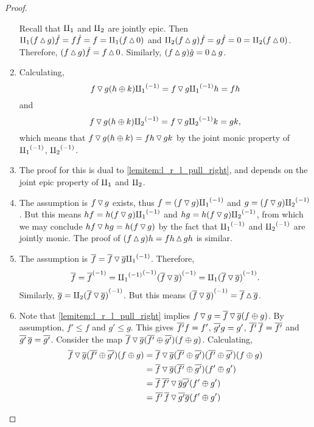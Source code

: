 \begin{proof}
\begin{enumerate}[{(}i{)}]
      Recall that $\amalg_{1}$ and $\amalg_{2}$ are jointly epic. Then
      $\amalg_{1}(f \operatorname{\vartriangle} g)\hat{f} = f\hat{f} = f = \amalg_{1}(f\operatorname{\vartriangle} 0) $ and
      $\amalg_{2}(f \operatorname{\vartriangle} g)\hat{f} = g\hat{f} = 0= \amalg_{2}(f\operatorname{\vartriangle} 0)$.
      Therefore, $(f \operatorname{\vartriangle} g)\hat{f} = f \operatorname{\vartriangle} 0$. Similarly,
      $(f \operatorname{\vartriangle} g) \hat{g} = 0 \operatorname{\vartriangle} g$.
    \item Calculating,
      \[
        f \operatorname{\triangledown} g (h \oplus k) {\amalg_{1}}^{(-1)} = f\operatorname{\triangledown} g {\amalg_{1}}^{(-1)} h = f h
      \]
      and
      \[
        f \operatorname{\triangledown} g (h \oplus k) {\amalg_{2}}^{(-1)} = f\operatorname{\triangledown} g {\amalg_{2}}^{(-1)} k = g k,
      \]
      which means that
      $f \operatorname{\triangledown} g (h \oplus k) = f h \operatorname{\triangledown} g k$ by the joint monic property of ${\amalg_{1}}^{(-1)}$, ${\amalg_{2}}^{(-1)}$.
    \item The proof for this is dual to \ref{lemitem:l_r_l_pull_right}, and depends on the joint
      epic property of $\amalg_{1}$ and $\amalg_{2}$.
    \item The assumption is $f\operatorname{\triangledown} g$ exists, thus $f = (f\operatorname{\triangledown} g){\amalg_{1}}^{(-1)}$ and
      $g = (f\operatorname{\triangledown} g){\amalg_{2}}^{(-1)}$. But this means $hf = h(f\operatorname{\triangledown} g){\amalg_{1}}^{(-1)}$ and
      $h g = h(f\operatorname{\triangledown} g){\amalg_{2}}^{(-1)}$, from which we may conclude $hf \operatorname{\triangledown} h g = h(f\operatorname{\triangledown} g)$ by
      the fact that ${\amalg_{1}}^{(-1)}$ and ${\amalg_{2}}^{(-1)}$ are jointly monic. The proof of
      $(f\operatorname{\vartriangle} g)h = f h \operatorname{\vartriangle} g h$ is similar.
    \item The assumption is $\overline{f} = \overline{f}\operatorname{\triangledown}\overline{g} {\amalg_{1}}^{(-1)}$. Therefore,
      \[
        \overline{f} = {\overline{f}}^{(-1)} = {{\amalg_{1}}^{(-1)}}^{(-1)}{(\overline{f}\operatorname{\triangledown}\overline{g})}^{(-1)}
          = \amalg_{1} {(\overline{f}\operatorname{\triangledown}\overline{g})}^{(-1)}.
      \]
      Similarly, $\overline{g} = \amalg_{2} {(\overline{f}\operatorname{\triangledown}\overline{g})}^{(-1)}$. But this means
      ${(\overline{f}\operatorname{\triangledown}\overline{g})}^{(-1)} = \overline{f}\operatorname{\vartriangle}\overline{g}$.
    \item Note that \ref{lemitem:l_r_l_pull_right} implies
      $f \operatorname{\triangledown} g  = \overline{f} \operatorname{\triangledown} \overline{g} (f\oplus g)$. By assumption, $f' \le f$ and $g' \le g$. This
      gives  $\overline{f'}f =f'$, $\overline{g'}g =g'$, $\overline{f'}\,\overline{f} =\overline{f'}$ and
      $\overline{g'}\,\overline{g} =\overline{g'}$. Consider the map
      $\overline{f} \operatorname{\triangledown} \overline{g} (\overline{f'}\oplus\overline{g'})(f\oplus g)$. Calculating,
      \begin{align*}
        \rst{f} \tjdown \rst{g} (\rst{f'}\+\rst{g'})(f\+g)
          &= \rst{f} \tjdown \rst{g} (\rst{f'}\+\rst{g'})(\rst{f'}\+\rst{g'})(f\+g) \\
          & = \rst{f} \tjdown \rst{g} (\rst{f'}\+\rst{g'})(f'\+g') \\
          & = \rst{f}\,\rst{f'} \tjdown \rst{g} \rst{g'} (f'\+g') \\
          & = \rst{f'}\,\rst{f} \tjdown \rst{g'} \rst{g} (f'\+g') \\

\end{align*}
\end{enumerate}
\end{proof}
